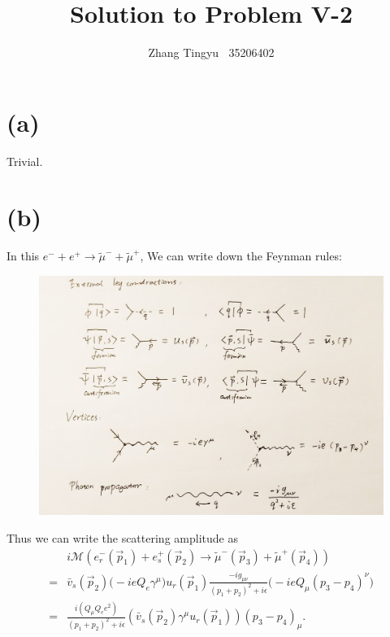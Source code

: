 \documentclass[12pt]{article}
\title{Solution to Problem V-2}
\author{Zhang Tingyu $\ $ 35206402}
\begin{document}
\maketitle

\section*{(a)}

Trivial.

\section*{(b)}

In this $e^-+e^+\rightarrow\tilde{\mu}^-+\tilde{\mu}^+$, We can write down the 
Feynman rules:
\begin{figure}[H]
    \centering
    \includegraphics[width=15cm]{1.jpg}
    \caption*{}
    \label{}
\end{figure}
Thus we can write the  scattering amplitude as 
\begin{equation}
    \begin{split}
        &i\mathcal{M}\left(e_{r}^{-}\left(\vec{p}_{1}\right)+e_{s}^{+}\left(
        \vec{p}_{2}\right) \rightarrow \tilde{\mu}^{-}\left(\vec{p}_{3}
        \right)+\tilde{\mu}^{+}\left(\vec{p}_{4}\right)\right)\\
        =&\bar{v}_s(\vec{p}_2)\big(-ieQ_e\gamma^\mu\big)u_r(\vec{p}_1)\frac{-ig_{\mu\nu}}
        {(p_1+p_2)^2+i\epsilon}\big(-ieQ_\mu(p_3-p_4)^\nu\big)\\
        =&\frac{i\left(Q_\mu Q_e e^2\right)}{(p_{1}+p_{2})^{2}+i\epsilon}
        \left(\bar{v}_{s}\left(\vec{p}_{2}\right)\gamma^{\mu} u_{r}\left(\vec{p}_{1}
        \right)\right)\left(p_{3}-p_{4}\right)_{\mu}.
    \end{split}
\end{equation}
\end{document}
